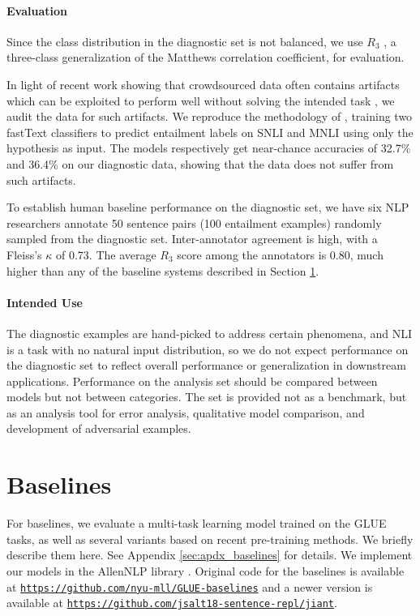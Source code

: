 \documentclass{article} \usepackage{iclr2019_conference,times}
\begin{document}
\paragraph{Evaluation}
Since the class distribution in the diagnostic set is not balanced, we use \(R_3\) \citep{gorodkin2004Rk}, a three-class generalization of the Matthews correlation coefficient, for evaluation.


In light of recent work showing that crowdsourced data often contains artifacts which can be exploited to perform well without solving the intended task 
\citep[][ i.a.]{schwartz17cloze,poliak2018hypothesis,TSUCHIYA18.786},
we audit the data for such artifacts.
We reproduce the methodology of \citet{gurudipta18artifacts},
training two fastText classifiers \citep{joulin2016bag} to predict entailment labels on SNLI and MNLI using only the hypothesis as input. 
The models respectively get near-chance accuracies of 32.7\% and 36.4\% on our diagnostic data, showing that the data does not suffer from such artifacts. 

To establish human baseline performance on the diagnostic set, we have six NLP researchers annotate 50 sentence pairs (100 entailment examples) randomly sampled from the diagnostic set. Inter-annotator agreement is high, with a Fleiss's \(\kappa\) of 0.73.
The average \(R_3\) score among the annotators is 0.80, much higher than any of the baseline systems described in Section \ref{sec:baselines}. 



\paragraph{Intended Use}
The diagnostic examples are hand-picked to address certain phenomena, and NLI is a task with no natural input distribution, so we do not expect performance on the diagnostic set to reflect overall performance or generalization in downstream applications. Performance on the analysis set should be compared between models but not between categories. The set is provided not as a benchmark, but as an analysis tool for error analysis, qualitative model comparison, and development of adversarial examples.




\section{Baselines}\label{sec:baselines}

For baselines, we evaluate a multi-task learning model trained on the GLUE tasks, as well as several variants based on recent pre-training methods.
We briefly describe them here. See Appendix \ref{sec:apdx_baselines} for details.
We implement our models in the AllenNLP library \citep{Gardner2017AllenNLPAD}.
Original code for the baselines is available at \texttt{\href{https://github.com/nyu-mll/GLUE-baselines}{https://github.com/nyu-mll/GLUE-baselines}} 
and a newer version is available at \texttt{\href{https://github.com/jsalt18-sentence-repl/jiant}{https://github.com/jsalt18-sentence-repl/jiant}}.
\end{document}
